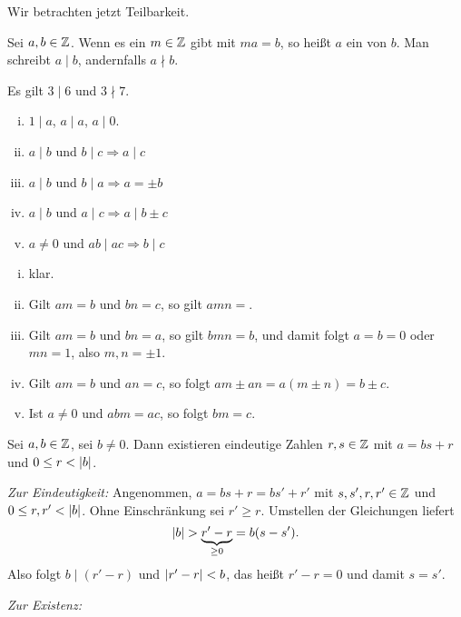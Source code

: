 	Wir betrachten jetzt Teilbarkeit.
	
	\begin{definition}[Teiler]
		\label{def:teiler}
		Sei $a,b \in \mathbb{Z}$.
		Wenn es ein $m \in \mathbb{Z}$ gibt mit $ma = b$, so heißt $a$ ein  von $b$. \marginnote{[4]}
		Man schreibt $a \mid b$, andernfalls $a \nmid b$. 
	\end{definition}

	\begin{beispiel}
		Es gilt $3 \mid 6$ und $3 \nmid 7$.
	\end{beispiel}

	\begin{satz}
		\label{satz:rechenregeln}
		\begin{enumerate}[(i)]
			\item $1 \mid a$, $a \mid a$, $a \mid 0$.
			\item $a \mid b$ und $b \mid c \Rightarrow a \mid c$
			\item $a \mid b$ und $b \mid a \Rightarrow a = \pm b$
			\item $a \mid b$ und $a \mid c \Rightarrow a \mid b \pm c$
			\item $a \neq 0$ und $ab \mid ac \Rightarrow b \mid c$
		\end{enumerate}
	\end{satz}

	\begin{beweis}
		\begin{enumerate}[(i)]
			\item klar.
			\item Gilt $am = b$ und $bn = c$, so gilt $amn = $.
			\item Gilt $am = b$ und $bn = a$, so gilt $bmn = b$, und damit folgt $a = b = 0$ oder $mn = 1$, also $m,n = \pm 1$.
			\item Gilt $am = b$ und $an = c$, so folgt $am \pm an = a(m \pm n) = b \pm c$.
			\item Ist $a \neq 0$ und $abm = ac$, so folgt $bm = c$.
		\end{enumerate}
	\end{beweis}

	\begin{satz}
		\label{satz:teilen mit rest}
		Sei $a,b \in \mathbb{Z}$, sei $b \neq 0$.  \marginnote{[5]}
		Dann existieren eindeutige Zahlen $r,s \in \mathbb{Z}$ mit $a = bs + r$ und $0 \leq r < \left\lvert b\right\rvert$.
	\end{satz}

	\begin{beweis}
		\textit{Zur Eindeutigkeit:} Angenommen, $a = bs + r = bs' + r'$ mit $s,s',r,r' \in \mathbb{Z}$ und $0 \leq r,r' < \left\lvert b\right\rvert$.
		Ohne Einschränkung sei $r' \geq r$.
		Umstellen der Gleichungen liefert
		\[
			\left\lvert b\right\rvert > \underbrace{r' - r}_{\geq 0} = b(s - s').
		\]
		Also folgt $b \mid (r'-r)$ und $\left\lvert r' - r\right\rvert < b$, das heißt $r' - r = 0$ und damit $s = s'$.
		
		\textit{Zur Existenz:} 
	\end{beweis}
\cleardoubleoddemptypage